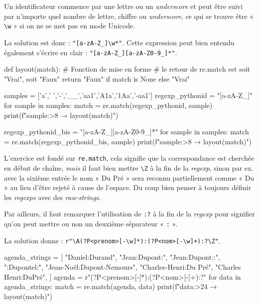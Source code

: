 \begin{solution}[ID=7]
Un identificateur commence par une lettre ou un \textit{underscore} et peut être suivi par n'importe quel nombre de lettre, chiffre ou \textit{underscore}, ce qui se trouve être « \texttt{\textbackslash{w}} » si on ne se met pas en mode Unicode.

La solution est donc : \lstinline[basicstyle={\shellttfont}]{"[a-zA-Z_]\w*"}. Cette expression peut bien entendu également s'écrire en clair : \lstinline[basicstyle={\shellttfont}]{"[a-zA-Z_][a-zA-Z0-9_]*"}.

\begin{idleconsole}
	\begin{pyconsole}
def layout(match): # Fonction de mise en forme
    # le retour de re.match est soit "Vrai", soit "Faux"
    return "Faux" if match is None else "Vrai"

samples = ['a',' ','-','__','aa1','A1a','1Aa','-aa1']
regexp_pythonid = "[a-zA-Z_]\w*"
for sample in samples:
    match = re.match(regexp_pythonid, sample)
    print(f"{sample:>8} → {layout(match)}")

regexp_pythonid_bis = "[a-zA-Z_][a-zA-Z0-9_]*"
for sample in samples:
    match = re.match(regexp_pythonid_bis, sample)
    print(f"{sample:>8} → {layout(match)}")

	\end{pyconsole}
\end{idleconsole}
\end{solution}


\begin{solution}
L'exercice est fondé sur \texttt{re.match}, cela signifie que la correspondance est cherchée en début de chaîne, \emph{mais} il faut bien mettre \lstinline[basicstyle={\shellttfont}]{\Z} à la fin de la \textit{regexp}, sinon par ex. avec la sixième entrée le nom « Du Pré » sera reconnu partiellement comme « Du » au lieu d'être rejeté à cause de l'espace. Du coup bien penser à toujours définir les \textit{regexps} avec des \textit{raw-strings}.

Par ailleurs, il faut remarquer l'utilisation de \texttt{:?} à la fin de la \textit{regexp} pour signifier qu'on peut mettre ou non un deuxième séparateur « \texttt{:} ».

La solution donne : \lstinline[basicstyle={\shellttfont}]{r"\A(?P<prenom>[-\w]*):(?P<nom>[-\w]+):?\Z"}.

\begin{idleconsole}
	\begin{pyconsole}
agenda_strings = [
    "Daniel:Durand",
    "Jean:Dupont:",
    "Jean:Dupont::",
    ":Dupontel:",
    "Jean-Noël:Dupont-Nemours",
    "Charles-Henri:Du Pré",
    "Charles Henri:DuPré",
]
agenda = r"\A(?P<prenom>[-\w]*):(?P<nom>[-\w]+):?\Z"
for data in agenda_strings:
    match = re.match(agenda, data)
    print(f"{data:>24} → {layout(match)}")

	\end{pyconsole}
\end{idleconsole}
\end{solution}


